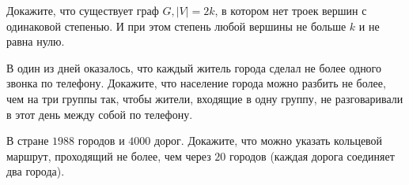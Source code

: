 \begin{exersize}
	Докажите, что существует граф $G, |V| = 2k$, в котором нет троек вершин с одинаковой степенью. И при этом степень любой вершины не больше $k$ и не равна нулю.
\end{exersize}

\begin{exersize}
	В один из дней оказалось, что каждый житель города сделал не более одного звонка по телефону. Докажите, что население города можно разбить не более, чем на три группы так, чтобы жители, входящие в одну группу, не разговаривали в этот день между собой по телефону.
\end{exersize}	 

\begin{exersize}
	В стране $1988$ городов и $4000$ дорог. Докажите, что можно указать кольцевой маршрут, проходящий не более, чем через $20$ городов (каждая дорога соединяет два города).
\end{exersize}
